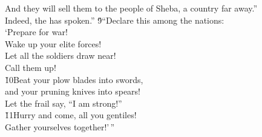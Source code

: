 \begin{poetry}
\poemll    And they will sell them to the people of Sheba, a country far away.'' \\
\poemlll       Indeed, the  has spoken.''
\poeml \v{9}``Declare this among the nations: \\
\poemll    `Prepare for war! \\
\poeml Wake up your elite forces! \\
\poemll    Let all the soldiers draw near! \\
\poemlll       Call them up! \\
\poeml \v{10}Beat your plow blades into swords, \\
\poemll    and your pruning knives into spears! \\
\poemlll       Let the frail say, ``I am strong!'' \\
\poeml \v{11}Hurry and come, all you gentiles! \\
\poemll    Gather yourselves together!'\,''
\end{poetry}

